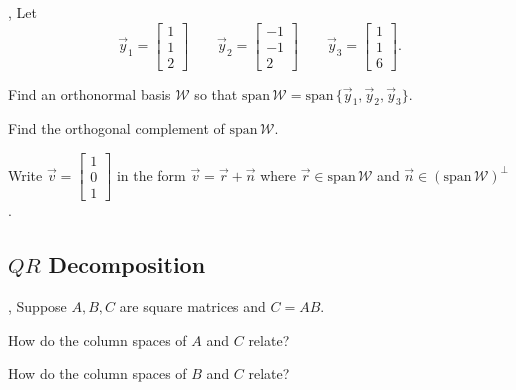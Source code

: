 \documentclass[letter]{article}
\renewcommand{\span}{\mathrm{span}\,}
\newcommand{\mat}[1]{\begin{bmatrix}#1\end{bmatrix}}
\renewcommand{\emph}[1]{{\color{defcolor} \textbf{\textit{##1}}}}
\begin{document}
	\sep
	Let
	\[
		\vec y_1=\mat{1\\1\\2}\qquad 
		\vec y_2=\mat{-1\\-1\\2}\qquad
		\vec y_3=\mat{1\\1\\6}.
	\]
	\begin{Enum}
		\item Find an orthonormal basis $\mathcal W$ so that $\span\mathcal W=
			\span\{\vec y_1,\vec y_2,\vec y_3\}$.
	\end{Enum}


	\begin{Enum}[resume]
		\item Find the orthogonal complement of $\span \mathcal W$.
		\item Write $\vec v=\mat{1\\0\\1}$ in the form $\vec v=\vec r+\vec n$ where 
			$\vec r\in\span\mathcal W$ and $\vec n\in(\span \mathcal W)^\perp$.
	\end{Enum}


\subsection*{$QR$ Decomposition}


	\sep
	Suppose $A,B,C$ are square matrices and $C=AB$.
	\begin{Enum}
		\item How do the column spaces of $A$ and $C$ relate?
		\item How do the column spaces of $B$ and $C$ relate?
	\end{Enum}
\end{document}
